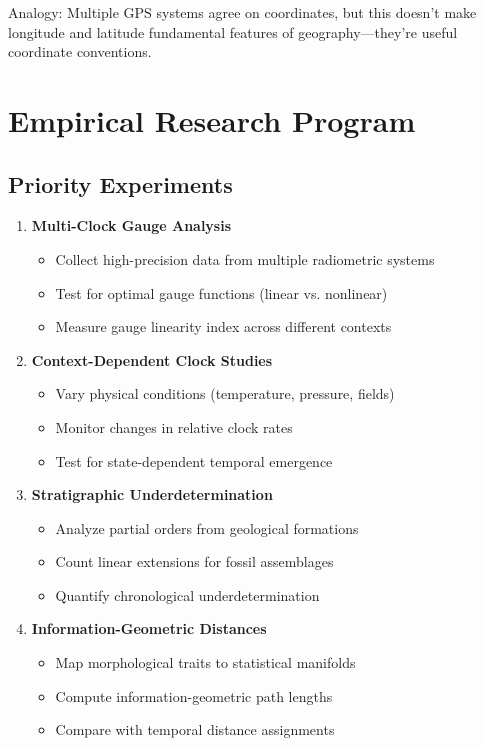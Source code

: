 \documentclass[11pt]{article}
\theoremstyle{definition}
\theoremstyle{plain}
\theoremstyle{remark}
\begin{document}
Analogy: Multiple GPS systems agree on coordinates, but this doesn't make longitude and latitude fundamental features of geography—they're useful coordinate conventions.

\section{Empirical Research Program}

\subsection{Priority Experiments}

\begin{enumerate}
\item \textbf{Multi-Clock Gauge Analysis}
   \begin{itemize}
   \item Collect high-precision data from multiple radiometric systems
   \item Test for optimal gauge functions (linear vs. nonlinear)
   \item Measure gauge linearity index across different contexts
   \end{itemize}

\item \textbf{Context-Dependent Clock Studies}
   \begin{itemize}
   \item Vary physical conditions (temperature, pressure, fields) 
   \item Monitor changes in relative clock rates
   \item Test for state-dependent temporal emergence
   \end{itemize}

\item \textbf{Stratigraphic Underdetermination}
   \begin{itemize}
   \item Analyze partial orders from geological formations
   \item Count linear extensions for fossil assemblages
   \item Quantify chronological underdetermination
   \end{itemize}

\item \textbf{Information-Geometric Distances}
   \begin{itemize}
   \item Map morphological traits to statistical manifolds
   \item Compute information-geometric path lengths
   \item Compare with temporal distance assignments
   \end{itemize}
\end{enumerate}
\end{document}
